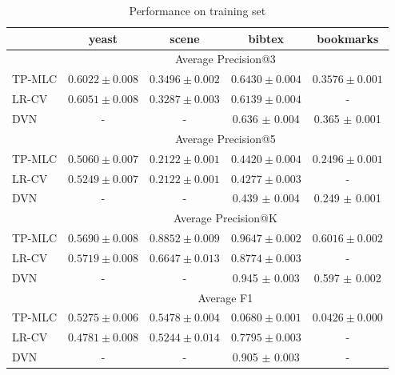 \begin{table}[!h]
\centering
\caption{Performance on training set}
\begin{tabular}{l|cccc} \hline \hline
 & yeast & scene & bibtex & bookmarks \\ \hline
 & \multicolumn{4}{c}{Average Precision@3} \\ \hline
TP-MLC & $0.6022 \pm  0.008$ & $0.3496 \pm  0.002$ & $0.6430 \pm  0.004$ & $0.3576 \pm  0.001$ \\
LR-CV & $0.6051 \pm  0.008$ & $0.3287 \pm  0.003$ & $0.6139 \pm  0.004$ & - \\
DVN & - & - & 0.636 $\pm$ 0.004 & 0.365 $\pm$ 0.001 \\ \hline
 & \multicolumn{4}{c}{Average Precision@5} \\ \hline
TP-MLC & $0.5060 \pm  0.007$ & $0.2122 \pm  0.001$ & $0.4420 \pm  0.004$ & $0.2496 \pm  0.001$ \\
LR-CV & $0.5249 \pm  0.007$ & $0.2122 \pm  0.001$ & $0.4277 \pm  0.003$ & - \\
DVN & - & - & 0.439 $\pm$ 0.004 & 0.249 $\pm$ 0.001 \\ \hline
 & \multicolumn{4}{c}{Average Precision@K} \\ \hline
TP-MLC & $0.5690 \pm  0.008$ & $0.8852 \pm  0.009$ & $0.9647 \pm  0.002$ & $0.6016 \pm  0.002$ \\
LR-CV & $0.5719 \pm  0.008$ & $0.6647 \pm  0.013$ & $0.8774 \pm  0.003$ & - \\
DVN & - & - & 0.945 $\pm$ 0.003 & 0.597 $\pm$ 0.002 \\ \hline
 & \multicolumn{4}{c}{Average F1} \\ \hline
TP-MLC & $0.5275 \pm  0.006$ & $0.5478 \pm  0.004$ & $0.0680 \pm  0.001$ & $0.0426 \pm  0.000$ \\
LR-CV & $0.4781 \pm  0.008$ & $0.5244 \pm  0.014$ & $0.7795 \pm  0.003$ & - \\
DVN & - & - & 0.905 $\pm$ 0.003 & - \\ \hline
\end{tabular}
\end{table}


